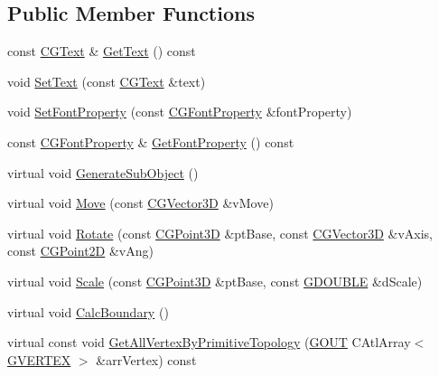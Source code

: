 \subsection*{Public Member Functions}
\begin{DoxyCompactItemize}
\item 
const \hyperlink{class_c_g_text}{C\+G\+Text} \& \hyperlink{class_c_g_object_text_abe0706adcb89e5991816edb72ef1908e}{Get\+Text} () const 
\item 
void \hyperlink{class_c_g_object_text_ad015769a0721c89de0805e8bc3fc8988}{Set\+Text} (const \hyperlink{class_c_g_text}{C\+G\+Text} \&text)
\item 
void \hyperlink{class_c_g_object_text_a0d1ca8607408dec62e5682aeae02c2a6}{Set\+Font\+Property} (const \hyperlink{class_c_g_font_property}{C\+G\+Font\+Property} \&font\+Property)
\item 
const \hyperlink{class_c_g_font_property}{C\+G\+Font\+Property} \& \hyperlink{class_c_g_object_text_a02356f253ae60e3f541833dc1c3761d3}{Get\+Font\+Property} () const 
\item 
virtual void \hyperlink{class_c_g_object_text_aae8534a3547edf21d440894d7ea2c9b1}{Generate\+Sub\+Object} ()
\item 
virtual void \hyperlink{class_c_g_object_text_ac854e411e1a58996f893f2c8e89027af}{Move} (const \hyperlink{_g_point3_d_8h_aa7e73d39f4c991acb5a13c84b498366d}{C\+G\+Vector3\+D} \&v\+Move)
\item 
virtual void \hyperlink{class_c_g_object_text_a09a247c6bee19ab63293f90cf528aa95}{Rotate} (const \hyperlink{class_c_g_point3_d}{C\+G\+Point3\+D} \&pt\+Base, const \hyperlink{_g_point3_d_8h_aa7e73d39f4c991acb5a13c84b498366d}{C\+G\+Vector3\+D} \&v\+Axis, const \hyperlink{class_c_g_point2_d}{C\+G\+Point2\+D} \&v\+Ang)
\item 
virtual void \hyperlink{class_c_g_object_text_ad4acca09ddef2daca4af6582dc9b4054}{Scale} (const \hyperlink{class_c_g_point3_d}{C\+G\+Point3\+D} \&pt\+Base, const \hyperlink{_g_types_8h_afd05ac85f90ee8e2a733928545462cd4}{G\+D\+O\+U\+B\+L\+E} \&d\+Scale)
\item 
virtual void \hyperlink{class_c_g_object_text_abf3876168580e7deed71c144dadeb53f}{Calc\+Boundary} ()
\item 
virtual const void \hyperlink{class_c_g_object_text_ab0949af68df7f548fe216f2d12587216}{Get\+All\+Vertex\+By\+Primitive\+Topology} (\hyperlink{_g_types_8h_a0858ec221262e635612871d70ca233ad}{G\+O\+U\+T} C\+Atl\+Array$<$ \hyperlink{struct_g_v_e_r_t_e_x}{G\+V\+E\+R\+T\+E\+X} $>$ \&arr\+Vertex) const 

\end{DoxyCompactItemize}
